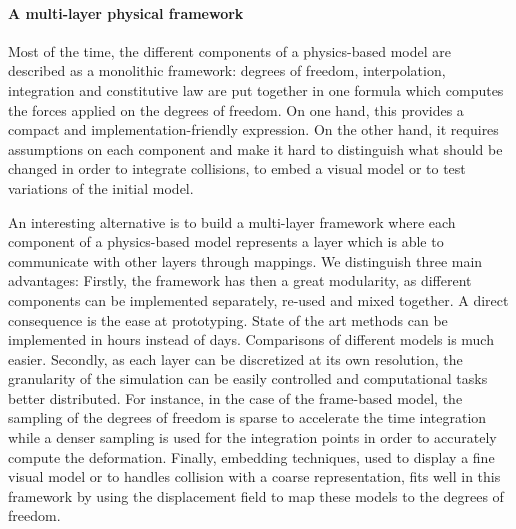 \paragraph{A multi-layer physical framework}
Most of the time, the different components of a physics-based model are described as a monolithic framework: degrees of freedom, interpolation, integration and constitutive law are put together in one formula which computes the forces applied on the degrees of freedom. On one hand, this provides a compact and implementation-friendly expression. 
On the other hand, it requires assumptions on each component and make it hard to distinguish what should be changed in order to integrate collisions, to embed a visual model or to test variations of the initial model.

An interesting alternative is to build a multi-layer framework where each component of a physics-based model represents a layer which is able to communicate with other layers through mappings. 
We distinguish three main advantages:
Firstly, the framework has then a great modularity, as different components can be implemented separately, re-used and mixed together. A direct consequence is the ease at prototyping. 
State of the art methods can be implemented in hours instead of days. 
Comparisons of different models is much easier. 
Secondly, as each layer can be discretized at its own resolution, the granularity of the simulation can be easily controlled and computational tasks better distributed.
For instance, in the case of the frame-based model, the sampling of the degrees of freedom is sparse to accelerate the time integration while a denser sampling is used for the integration points in order to accurately compute the deformation.
Finally, embedding techniques, used to display a fine visual model or to handles collision with a coarse representation, fits well in this framework by using the displacement field to map these models to the degrees of freedom.

